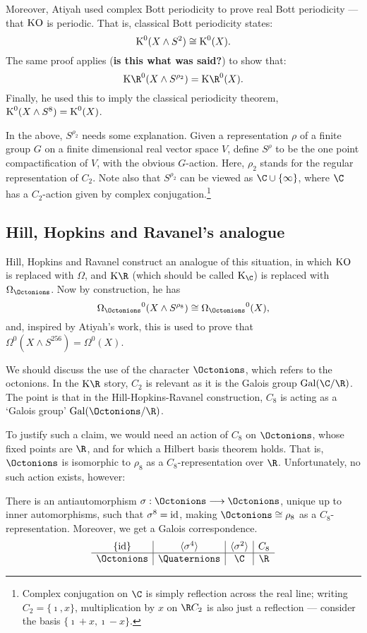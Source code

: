 \documentclass[11pt]{article}
\begin{document}
\begin{FirstNineLectures}
Moreover, Atiyah used complex Bott periodicity to prove real Bott periodicity
--- that $\operatorname{{KO}}$ is periodic. That is, classical Bott periodicity states:
\[\operatorname{{K}}^0(X\wedge S^2)\cong \operatorname{{K}}^0(X).\]
The same proof applies (\textbf{is this what was said?}) to show that:
\[\KR^0(X\wedge S^{\rho_2})=\KR^0(X).\]
Finally, he used this to imply the classical periodicity theorem, $\operatorname{{K}}^0(X\wedge
S^8)=\operatorname{{K}}^0(X)$.

In the above, $S^{\rho_2}$ needs some explanation. Given a representation $\rho$
of a finite group $G$ on a finite dimensional real vector space $V$, define
$S^{\rho}$ to be the one point compactification of $V$, with the obvious
$G$-action. Here, $\rho_2$ stands for the regular representation of $C_2$.
Note also that $S^{\rho_2}$ can be viewed as $\C\cup\{\infty\}$, where $\C$ has
a $C_2$-action given by complex conjugation.\footnote{Complex conjugation on
$\C$ is simply reflection across the real line; writing $C_2=\{\imath,x\}$,
multiplication by $x$ on $\R C_2$ is also just a reflection --- consider the
basis $\{\imath+x,\imath-x\}$.}

\subsection*{Hill, Hopkins and Ravanel's analogue}
Hill, Hopkins and Ravanel construct an analogue of this situation, in which $\operatorname{{KO}}$ is replaced with
$\Omega$, and $\KR$ (which should be called $\K_\C$) is replaced with $\OmegaO$.
Now by construction, he has
\[\OmegaO^0(X\wedge S^{\rho_8})\cong\OmegaO^0(X),\]
and, inspired by Atiyah's work, this is used to prove that $\Omega^0(X\wedge
S^{256})=\Omega^0(X)$.

We should discuss the use of the character $\Octonions$, which refers to the
octonions. In the $\KR$ story, $C_2$ is relevant as it is the Galois group
$\Gal(\C/\R)$. The point is that in the Hill-Hopkins-Ravanel construction, $C_8$ is acting as a
`Galois group' $\Gal(\Octonions/\R)$.

To justify such a claim, we would need an action of $C_8$ on $\Octonions$, whose
fixed points are $\R$, and for which a Hilbert basis theorem holds. That is,
$\Octonions$ is isomorphic to $\rho_8$ as a $C_8$-representation over $\R$.
Unfortunately, no such action exists, however:
\begin{fact*}
There is an antiautomorphism $\sigma:\Octonions\to \Octonions$, unique up to
inner automorphisms, such that $\sigma^8=\textup{id}$, making $\Octonions\cong\rho_8$ as
a $C_8$-representation. Moreover, we get a Galois correspondence.
\[\begin{array}{c|c|c|c}
\{\id\}&\langle\sigma^4\rangle&\langle\sigma^2\rangle&C_8\\\hline
\Octonions&\Quaternions&\C&\R
\end{array}\]
\end{fact*}

\end{FirstNineLectures}
\end{document}
